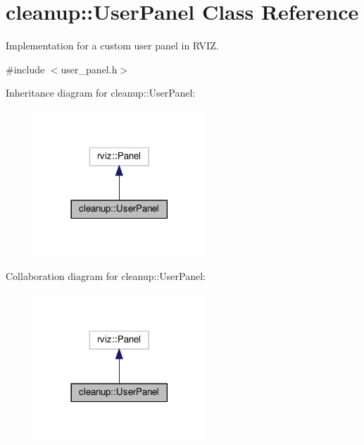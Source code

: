\hypertarget{classcleanup_1_1_user_panel}{}\section{cleanup\+:\+:User\+Panel Class Reference}
\label{classcleanup_1_1_user_panel}


Implementation for a custom user panel in R\+V\+IZ.  




{\ttfamily \#include $<$user\+\_\+panel.\+h$>$}



Inheritance diagram for cleanup\+:\+:User\+Panel\+:\nopagebreak
\begin{figure}[H]
\begin{center}
\leavevmode
\includegraphics[width=182pt]{classcleanup_1_1_user_panel__inherit__graph}
\end{center}
\end{figure}


Collaboration diagram for cleanup\+:\+:User\+Panel\+:\nopagebreak
\begin{figure}[H]
\begin{center}
\leavevmode
\includegraphics[width=182pt]{classcleanup_1_1_user_panel__coll__graph}
\end{center}
\end{figure}
